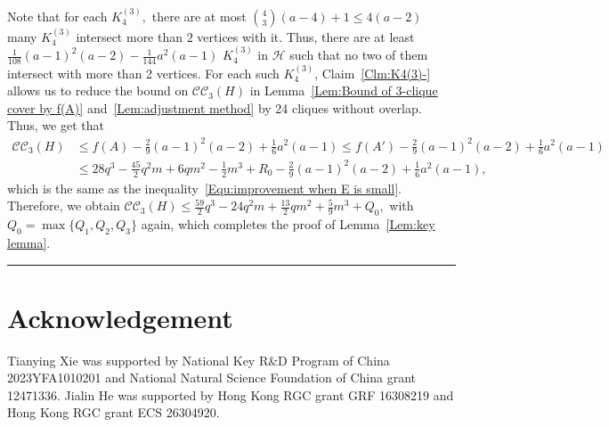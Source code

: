 \documentclass[11pt,a4paper]{article}
\def\QED{\hfill \rule{7pt}{7pt}}
\newcommand{\dH}{{\mathcal{H}}}
\newcommand{\coveropt}[2]{{\mathcal{C}\mathcal{C}_{#1}(#2)}}
\begin{document}
Note that for each $K_4^{(3)},$ there are at most $\binom 4 3(a-4)+1\leq 4(a-2)$ many
$K_4^{(3)}$ intersect more than $2$ vertices with it.
Thus, there are at least
$\frac{1}{108}(a-1)^2(a-2)-\frac{1}{144}a^2(a-1)$
$K_4^{(3)}$ in $\dH$ such that no two of them intersect with more than 2 vertices.
For each such $K_4^{(3)}$, Claim~\ref{Clm:K4(3)-} allows us to reduce the bound on $\coveropt{3}{H}$ in Lemma~\ref{Lem:Bound of 3-clique cover by f(A)} and~\ref{Lem:adjustment method} by 24 cliques without overlap. 
Thus, we get that
\begin{align*}
\coveropt{3}{H}
&\leq  
f(A)-\frac{2}{9}(a-1)^2(a-2)+\frac{1}{6}a^2(a-1)\le 
f(A')-\frac{2}{9}(a-1)^2(a-2)+\frac{1}{6}a^2(a-1)\\
&\leq
28q^3-\frac{45}{2}q^2m+6qm^2-\frac{1}{2}m^3+R_0
-\frac{2}{9}(a-1)^2(a-2)+\frac{1}{6}a^2(a-1),
\end{align*}
which is the same as the inequality~\eqref{Equ:improvement when E is small}.
Therefore, we obtain
$\coveropt{3}{H}\le \frac{59} 2 q^3 - 24 q^2 m + \frac{13}{2} q m^2 + \frac{5}{9} m^3+Q_0,$ 
with $Q_0=\max\{Q_1,Q_2,Q_3\}$ again, which completes the proof of Lemma~\ref{Lem:key lemma}.
\QED


\section*{Acknowledgement}
Tianying Xie was supported by National Key R\&D Program of China 2023YFA1010201 and National Natural Science Foundation of China grant 12471336. Jialin He was supported by Hong Kong RGC grant GRF 16308219 and Hong Kong RGC grant ECS 26304920.
\end{document}
